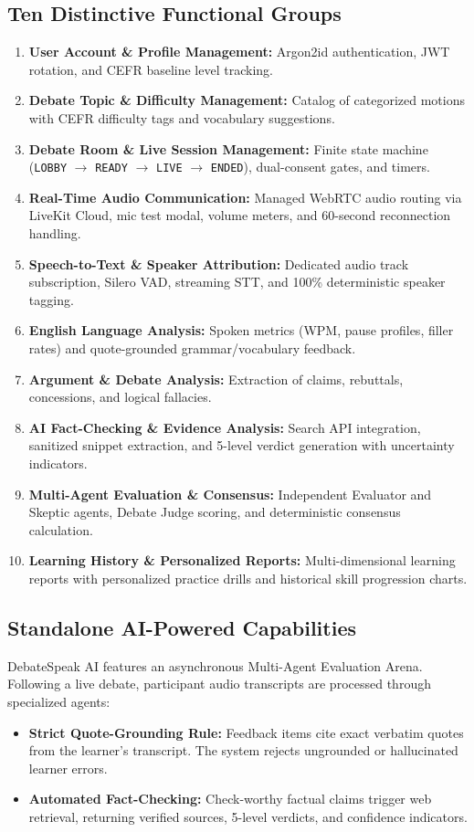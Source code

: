 \documentclass[11pt,a4paper]{article}
\begin{document}
\subsection{Ten Distinctive Functional Groups}
\begin{enumerate}[leftmargin=1.5cm, label=\textbf{FG-\arabic*:}]
    \item \textbf{User Account \& Profile Management:} Argon2id authentication, JWT rotation, and CEFR baseline level tracking.
    \item \textbf{Debate Topic \& Difficulty Management:} Catalog of categorized motions with CEFR difficulty tags and vocabulary suggestions.
    \item \textbf{Debate Room \& Live Session Management:} Finite state machine (\texttt{LOBBY} $\to$ \texttt{READY} $\to$ \texttt{LIVE} $\to$ \texttt{ENDED}), dual-consent gates, and timers.
    \item \textbf{Real-Time Audio Communication:} Managed WebRTC audio routing via LiveKit Cloud, mic test modal, volume meters, and 60-second reconnection handling.
    \item \textbf{Speech-to-Text \& Speaker Attribution:} Dedicated audio track subscription, Silero VAD, streaming STT, and 100\% deterministic speaker tagging.
    \item \textbf{English Language Analysis:} Spoken metrics (WPM, pause profiles, filler rates) and quote-grounded grammar/vocabulary feedback.
    \item \textbf{Argument \& Debate Analysis:} Extraction of claims, rebuttals, concessions, and logical fallacies.
    \item \textbf{AI Fact-Checking \& Evidence Analysis:} Search API integration, sanitized snippet extraction, and 5-level verdict generation with uncertainty indicators.
    \item \textbf{Multi-Agent Evaluation \& Consensus:} Independent Evaluator and Skeptic agents, Debate Judge scoring, and deterministic consensus calculation.
    \item \textbf{Learning History \& Personalized Reports:} Multi-dimensional learning reports with personalized practice drills and historical skill progression charts.
\end{enumerate}

\subsection{Standalone AI-Powered Capabilities}
DebateSpeak AI features an asynchronous Multi-Agent Evaluation Arena. Following a live debate, participant audio transcripts are processed through specialized agents:
\begin{itemize}[leftmargin=1.2cm]
    \item \textbf{Strict Quote-Grounding Rule:} Feedback items cite exact verbatim quotes from the learner's transcript. The system rejects ungrounded or hallucinated learner errors.
    \item \textbf{Automated Fact-Checking:} Check-worthy factual claims trigger web retrieval, returning verified sources, 5-level verdicts, and confidence indicators.
\end{itemize}
\end{document}
